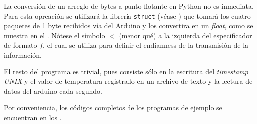

La conversión de un arreglo de bytes a punto flotante en Python no es inmediata.
Para esta opreación se utilizará la librería \texttt{struct} (véase ) que tomará los cuatro paquetes de 1 byte recibidos vía \IIC del Arduino y los convertira en un \emph{float}, como se muestra en el .
Nótese el símbolo $<$ (menor qué) a la izquierda del especificador de formato $f$, el cual se utiliza para definir el endianness de la transmisión de la información.



El resto del programa es trivial, pues consiste sólo en la escritura del \emph{timestamp UNIX} y el valor de temperatura registrado en un archivo de texto y la lectura de datos del arduino cada segundo.

Por conveniencia, los códigos completos de los programas de ejemplo se encuentran en los .
